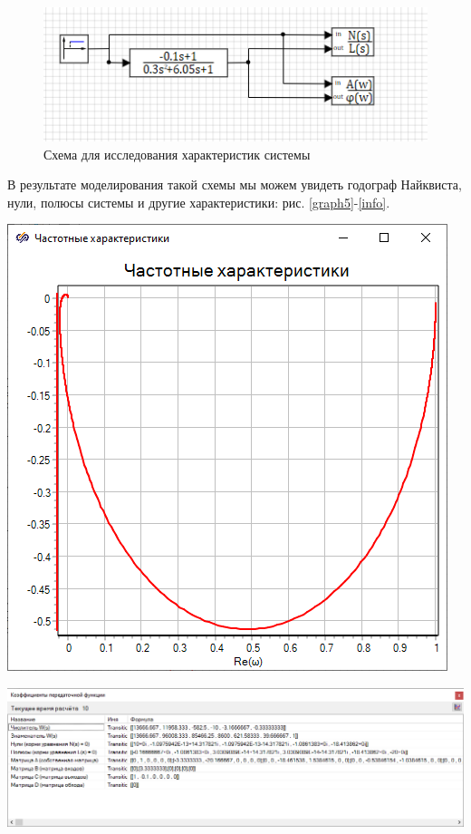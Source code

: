 	\begin{figure}[h]
		\centering\includegraphics[width=.7\textwidth]{png/scheme3.png}
		\caption{Схема для исследования характеристик системы}
		\label{scheme3}
	\end{figure}

	В результате моделирования такой схемы мы можем увидеть годограф Найквиста, нули, полюсы системы и другие характеристики: рис. \ref{graph5}-\ref{info}.
	
	\noindent\begin{minipage}{.4\textwidth}
		\centering\includegraphics[width=.8\textwidth]{png/graph5.png}
		\label{graph5}
	\end{minipage}
	\begin{minipage}{.6\textwidth}
		\centering\includegraphics[width=\textwidth]{png/info.png}
		\label{info}
	\end{minipage}
	
